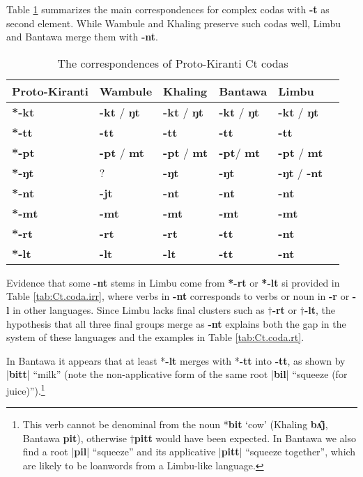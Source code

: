 \documentclass[oldfontcommands,oneside,a4paper,11pt]{article}
\newcommand{\ipa}[1]{\textbf{{\phon\mbox{#1}}}} %
\newcommand{\dhatu}[2]{|\ipa{#1}| ``#2''}
\begin{document}
Table \ref{tab:Ct.coda} summarizes the main correspondences for complex codas with \ipa{-t} as second element. While Wambule and Khaling preserve such codas well, Limbu and Bantawa merge them with \ipa{-nt}.

\begin{table}[H]
\caption{The correspondences of Proto-Kiranti Ct codas} \centering \label{tab:Ct.coda}
\begin{tabular}{llllll}
\toprule
Proto-Kiranti & Wambule & Khaling & Bantawa & Limbu \\
\midrule
\ipa{*-kt} & \ipa{-kt} / \ipa{ŋt} & \ipa{-kt} / \ipa{ŋt} & \ipa{-kt} / \ipa{ŋt} & \ipa{-kt} / \ipa{ŋt}  \\
\ipa{*-tt} & \ipa{-tt} & \ipa{-tt}  & \ipa{-tt} & \ipa{-tt} \\
\ipa{*-pt} & \ipa{-pt} / \ipa{mt} & \ipa{-pt} / \ipa{mt}& \ipa{-pt}/ \ipa{mt} & \ipa{-pt} / \ipa{mt} \\
\midrule
\ipa{*-ŋt} & ?& \ipa{-ŋt} & \ipa{-ŋt} & \ipa{-ŋt}  / \ipa{-nt} \\
\ipa{*-nt} & \ipa{-jt}  & \ipa{-nt} & \ipa{-nt} & \ipa{-nt}  \\
\ipa{*-mt} & \ipa{-mt} & \ipa{-mt} & \ipa{-mt} & \ipa{-mt}  \\
\midrule
\ipa{*-rt} &  \ipa{-rt}  & \ipa{-rt} & \ipa{-tt}  & \ipa{-nt}  \\
\ipa{*-lt} & \ipa{-lt} & \ipa{-lt} & \ipa{-tt} & \ipa{-nt}  \\
\bottomrule
\end{tabular}
\end{table}

Evidence that some \ipa{-nt} stems in Limbu come from \ipa{*-rt} or \ipa{*-lt} si provided in Table \ref{tab:Ct.coda.irr}, where verbs in \ipa{-nt} corresponds to verbs or noun in \ipa{-r} or \ipa{-l} in other languages. Since  Limbu  lacks final clusters such as $\dagger$\ipa{-rt} or $\dagger$\ipa{-lt}, the hypothesis that all three final groups merge as \ipa{-nt} explains both the gap in the system of these languages and the examples in Table \ref{tab:Ct.coda.rt}. 

In Bantawa it appears that at least *\ipa{-lt} merges with *\ipa{-tt} into \ipa{-tt}, as shown by \dhatu{bitt}{milk} (note the non-applicative form of the same root \dhatu{bil}{squeeze (for juice)}).\footnote{This verb cannot be denominal from the noun *\ipa{bit} `cow'  (Khaling \ipa{bʌ̂j}, Bantawa \ipa{pit}), otherwise $\dagger$\ipa{pitt} would have been expected. In Bantawa we also find a root  \dhatu{pil}{squeeze} and its applicative \dhatu{pitt}{squeeze together}, which are likely to be loanwords from a Limbu-like language.}
\end{document}
